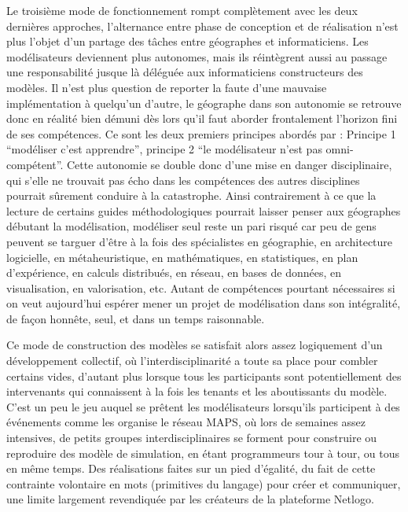 Le troisième mode de fonctionnement rompt complètement avec les deux dernières approches, l'alternance entre phase de conception et de réalisation n'est plus l'objet d'un partage des tâches entre géographes et informaticiens. Les modélisateurs deviennent plus autonomes, mais ils réintègrent aussi au passage une responsabilité jusque là déléguée aux informaticiens constructeurs des modèles. Il n'est plus question de reporter la faute d'une mauvaise implémentation à quelqu'un d'autre, le géographe dans son autonomie se retrouve donc en réalité bien démuni dès lors qu'il faut aborder frontalement l'horizon fini de ses compétences. Ce sont les deux premiers principes abordés par \textcite[77]{Banos2013} : Principe 1 \enquote{modéliser c'est apprendre}, principe  2 \enquote{le modélisateur n'est pas omni-compétent}. Cette autonomie se double donc d'une mise en danger disciplinaire, qui s'elle ne trouvait pas écho dans les compétences des autres disciplines pourrait sûrement conduire à la catastrophe. Ainsi contrairement à ce que la lecture de certains guides méthodologiques pourrait laisser penser aux géographes débutant la modélisation, modéliser seul reste un pari risqué car peu de gens peuvent se targuer d'être à la fois des spécialistes en géographie, en architecture logicielle, en métaheuristique, en mathématiques, en statistiques, en plan d'expérience, en calculs distribués, en réseau, en bases de données, en visualisation, en valorisation, etc. Autant de compétences pourtant nécessaires si on veut aujourd'hui espérer mener un projet de modélisation dans son intégralité, de façon honnête, seul, et dans un temps raisonnable.


Ce mode de construction des modèles se satisfait alors assez logiquement d'un développement collectif, où l'interdisciplinarité a toute sa place pour combler certains vides, d'autant plus lorsque tous les participants sont potentiellement des intervenants qui connaissent à la fois les tenants et les aboutissants du modèle. C'est un peu le jeu auquel se prêtent les modélisateurs lorsqu'ils participent à des événements comme les organise le réseau MAPS, où lors de semaines assez intensives, de petits groupes interdisciplinaires se forment pour construire ou reproduire des modèle de simulation, en étant programmeurs tour à tour, ou tous en même temps. Des réalisations faites sur un pied d'égalité, du fait de cette contrainte volontaire en mots (primitives du langage) pour créer et communiquer, une limite largement revendiquée par les créateurs de la plateforme Netlogo.

